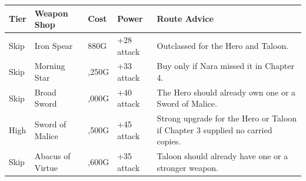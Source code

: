 \documentclass[
  american,
  10pt,
  letterpaper,
  oneside,
  open=any]{scrreprt}
\newcounter{none} %
\newenvironment{guidetable}{%
  \small\setstretch{1.0}%
  \setlength{\tabcolsep}{4pt}%
  \setlength{\LTpre}{8pt}\setlength{\LTpost}{10pt}%
  \renewcommand{\arraystretch}{1.16}%
}{ }
\begin{document}
\begin{guidetable}

{\def\LTcaptype{none} %
\begin{longtable}[]{@{}
  >{\raggedright\arraybackslash}p{}
  >{\raggedright\arraybackslash}p{}
  >{\raggedleft\arraybackslash}p{}
  >{\raggedleft\arraybackslash}p{}
  >{\raggedright\arraybackslash}p{}@{}}
\toprule\noalign{}
\begin{minipage}[b]{\linewidth}\raggedright
\color{GuideGreen}\bfseries Tier
\end{minipage} & \begin{minipage}[b]{\linewidth}\raggedright
\color{GuideGreen}\bfseries Weapon Shop
\end{minipage} & \begin{minipage}[b]{\linewidth}\raggedleft
\color{GuideGreen}\bfseries Cost
\end{minipage} & \begin{minipage}[b]{\linewidth}\raggedleft
\color{GuideGreen}\bfseries Power
\end{minipage} & \begin{minipage}[b]{\linewidth}\raggedright
\color{GuideGreen}\bfseries Route Advice
\end{minipage} \\
\midrule\noalign{}
\endhead
\bottomrule\noalign{}
\endlastfoot
Skip & Iron Spear & 880G & +28 attack & Outclassed for the Hero and
Taloon. \\
Skip & Morning Star & 1,250G & +33 attack & Buy only if Nara missed it
in Chapter 4. \\
Skip & Broad Sword & 2,000G & +40 attack & The Hero should already own
one or a Sword of Malice. \\
High & Sword of Malice & 3,500G & +45 attack & Strong upgrade for the
Hero or Taloon if Chapter 3 supplied no carried copies. \\
Skip & Abacus of Virtue & 1,600G & +35 attack & Taloon should already
have one or a stronger weapon. \\
\end{longtable}
}

\end{guidetable}
\end{document}
